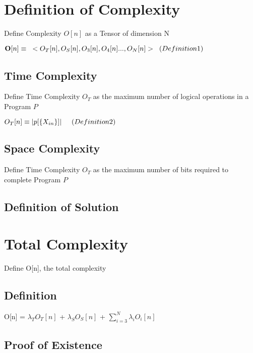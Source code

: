 \documentclass[11pt]{article}
\begin{document}
\section{Definition of Complexity}
Define Complexity $O[n]$ as a Tensor of dimension N
\begin{center}
$
\bold{O}[n] \equiv \hspace{3mm} < O_T [n], O_S [n],O_3[n],O_4[n]...,O_N[n]> \hspace{2mm} (Definition 1)
$
\end{center}




\subsection{Time Complexity}
Define Time Complexity $O_T$ as the maximum number of logical operations in a Program $P$
\begin{center}
$
O_T[n] \equiv |p\lbrack \{ X_{in} \} \rbrack| \hspace{5mm} (Definition 2)
$
\end{center}

\subsection{Space Complexity}
Define Time Complexity $O_T$ as the maximum number of bits required to complete Program $P$

\subsection{Definition of Solution}






\section{Total Complexity}
Define O[n], the total complexity
\subsection{Definition}
O[n] = $\lambda_T$$O_T[n]$ + $\lambda_S$$O_S[n]$ + $\sum_{i=3}^{N}${$\lambda_i$$O_i[n]$}
\subsection{Proof of Existence}
\end{document}
